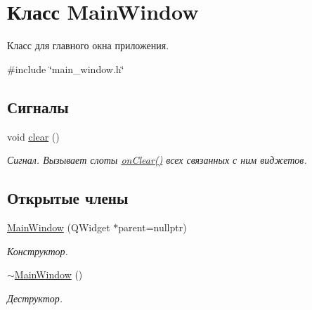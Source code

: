 \hypertarget{class_main_window}{}\section{Класс Main\+Window}
\label{class_main_window}


Класс для главного окна приложения.  




{\ttfamily \#include \char`\"{}main\+\_\+window.\+h\char`\"{}}

\subsection*{Сигналы}
\begin{DoxyCompactItemize}
\item 
\hypertarget{class_main_window_a77557e32fb4ed3530daf2f6225c877db}{}\label{class_main_window_a77557e32fb4ed3530daf2f6225c877db} 
void \hyperlink{class_main_window_a77557e32fb4ed3530daf2f6225c877db}{clear} ()
\begin{DoxyCompactList}\small\item\em Сигнал. Вызывает слоты \hyperlink{class_main_window_ab1db88110806edae5fc7a1d7a24267f7}{on\+Clear()} всех связанных с ним виджетов. \end{DoxyCompactList}\end{DoxyCompactItemize}
\subsection*{Открытые члены}
\begin{DoxyCompactItemize}
\item 
\hypertarget{class_main_window_a996c5a2b6f77944776856f08ec30858d}{}\label{class_main_window_a996c5a2b6f77944776856f08ec30858d} 
\hyperlink{class_main_window_a996c5a2b6f77944776856f08ec30858d}{Main\+Window} (Q\+Widget $\ast$parent=nullptr)
\begin{DoxyCompactList}\small\item\em Конструктор. \end{DoxyCompactList}\item 
\hypertarget{class_main_window_ae98d00a93bc118200eeef9f9bba1dba7}{}\label{class_main_window_ae98d00a93bc118200eeef9f9bba1dba7} 
\hyperlink{class_main_window_ae98d00a93bc118200eeef9f9bba1dba7}{$\sim$\+Main\+Window} ()
\begin{DoxyCompactList}\small\item\em Деструктор. \end{DoxyCompactList}\end{DoxyCompactItemize}
